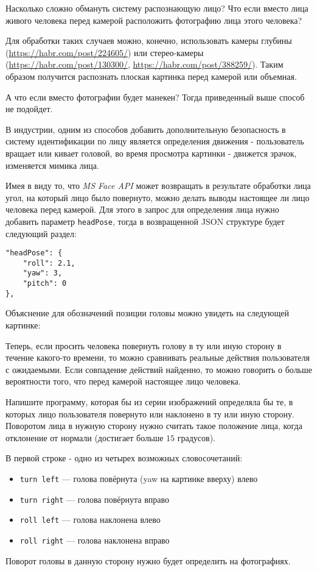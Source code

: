 
Насколько сложно обмануть систему распознающую лицо? Что если вместо лица живого человека перед камерой расположить фотографию лица этого человека?

Для обработки таких случаев можно, конечно, использовать камеры глубины (\url{https://habr.com/post/224605/}) или стерео-камеры (\url{https://habr.com/post/130300/}, \url{https://habr.com/post/388259/}). Таким образом получится распознать плоская картинка перед камерой или объемная.

А что если вместо фотографии будет манекен? Тогда приведенный выше способ не подойдет.

В индустрии, одним из способов добавить дополнительную безопасность в систему идентификации по лицу является определения движения - пользователь вращает или кивает головой, во время просмотра картинки - движется зрачок, изменяется мимика лица.

Имея в виду то, что \textit{MS Face API} может возвращать в результате обработки лица угол, на который лицо было повернуто, можно делать выводы настоящее ли лицо человека перед камерой. Для этого в запрос для определения лица нужно добавить параметр \texttt{headPose}, тогда в возвращенной JSON структуре будет следующий раздел:

\begin{verbatim}
"headPose": {
    "roll": 2.1,
    "yaw": 3,
    "pitch": 0
},    
\end{verbatim}

Объяснение для обозначений позиции головы можно увидеть на следующей картинке:


Теперь, если просить человека повернуть голову в ту или иную сторону в течение какого-то времени, то можно сравнивать реальные действия пользователя с ожидаемыми. Если совпадение действий найденно, то можно говорить о больше вероятности того, что перед камерой настоящее лицо человека.

Напишите программу, которая бы из серии изображений определяла бы те, в которых лицо пользователя повернуто или наклонено в ту или иную сторону. Поворотом лица в нужную сторону нужно считать такое положение лица, когда отклонение от нормали (достигает больше $15$ градусов).


В первой строке - одно из четырех возможных словосочетаний:
\begin{itemize}
  \item \texttt{turn left} --- голова повёрнута (yaw на картинке вверху) влево  
  \item \texttt{turn right} --- голова повёрнута вправо
  \item \texttt{roll left} --- голова наклонена влево
  \item \texttt{roll right} --- голова наклонена вправо
\end{itemize}
Поворот головы в данную сторону нужно будет определить на фотографиях.

